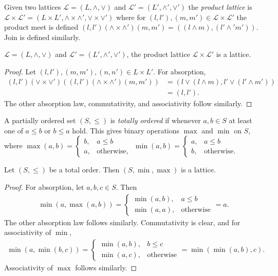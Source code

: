 \begin{definition}
  Given two lattices $\mathcal{L} = (L, \wedge, \vee)$ and $\mathcal{L'} = (L', \wedge', \vee')$ the \emph{product lattice} 
  is $\mathcal{L} \times \mathcal{L'} = (L \times L', \wedge \times \wedge', \vee \times \vee')$ where for $(l, l'), (m, m') \in \mathcal{L} \times \mathcal{L'}$
  the product meet is defined $(l, l') (\wedge \times \wedge') (m, m') = ((l \wedge m), (l' \wedge' m'))$. Join is defined similarly.
\end{definition}
\begin{prop}
  $\mathcal{L} = (L, \wedge, \vee)$ and $\mathcal{L'} = (L', \wedge', \vee')$, the product lattice $\mathcal{L} \times \mathcal{L'}$ is a lattice.
\end{prop}
\begin{proof}
  Let $(l, l'), (m, m'), (n, n') \in L \times L'$. For absorption, 
  \begin{align*}
    (l, l') (\vee \times \vee') ((l, l') (\wedge \times \wedge') (m, m')) &= (l \vee (l \wedge m), l' \vee (l' \wedge m')) \\
                                                                          &= (l, l').
  \end{align*}
  The other absorption law, commutativity, and associativity follow similarly.
\end{proof}
\begin{definition}
  A partially ordered set $(S, \leq)$ is \emph{totally ordered} if whenever $a, b \in S$ at least one of $a \leq b$ or $b \leq a$ hold.
  This gives binary operations $\max$ and $\min$ on $S$, where $\max (a, b) = \begin{cases} b, & a \leq b \\ a, & \text{otherwise,}  \end{cases}$
    $\min (a, b) = \begin{cases} a, & a \leq b \\ b, & \text{otherwise.}  \end{cases}$
\end{definition}
\begin{prop}
  Let $(S, \leq)$ be a total order. Then $(S, \min, \max)$ is a lattice.
\end{prop}
\begin{proof}
  For absorption, let $a, b, c \in S$. Then 
  \begin{align*}
    \min(a, \max(a, b)) = \begin{cases} \min(a, b), & a \leq b \\ \min(a, a), & \text{otherwise}\end{cases} = a.
  \end{align*}
  The other absorption law follows similarly. Commutativity is clear, and for associativity of $\min$,
  \begin{align*}
    \min(a, \min(b, c)) = \begin{cases} \min(a, b), &  b \leq c \\ \min(a, c), & \text{otherwise}\end{cases} = \min(\min(a, b), c).
  \end{align*}
  Associativity of $\max$ follows similarly.
\end{proof}
